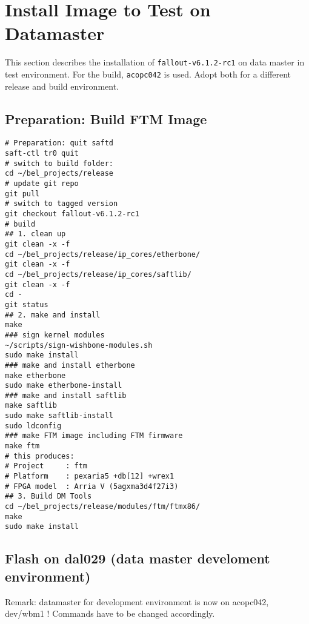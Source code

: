 \documentclass[12pt,a4paper]{report}
\begin{document}
\section{Install Image to Test on Datamaster}
This section describes the installation of \texttt{fallout-v6.1.2-rc1} on data master in test environment.
For the build, \texttt{acopc042} is used. Adopt both for a different release and build environment.

\subsection{Preparation: Build FTM Image}
\begin{verbatim}
# Preparation: quit saftd
saft-ctl tr0 quit
# switch to build folder:
cd ~/bel_projects/release
# update git repo
git pull
# switch to tagged version
git checkout fallout-v6.1.2-rc1
# build
## 1. clean up
git clean -x -f
cd ~/bel_projects/release/ip_cores/etherbone/
git clean -x -f
cd ~/bel_projects/release/ip_cores/saftlib/
git clean -x -f
cd -
git status
## 2. make and install
make
### sign kernel modules
~/scripts/sign-wishbone-modules.sh
sudo make install
### make and install etherbone
make etherbone
sudo make etherbone-install
### make and install saftlib
make saftlib
sudo make saftlib-install
sudo ldconfig
### make FTM image including FTM firmware
make ftm
# this produces:
# Project     : ftm
# Platform    : pexaria5 +db[12] +wrex1
# FPGA model  : Arria V (5agxma3d4f27i3)
## 3. Build DM Tools
cd ~/bel_projects/release/modules/ftm/ftmx86/
make
sudo make install
\end{verbatim}

\subsection{Flash on dal029 (data master develoment environment)}

Remark: datamaster for development environment is now on acopc042, dev/wbm1 ! Commands have to be changed accordingly.
\end{document}
